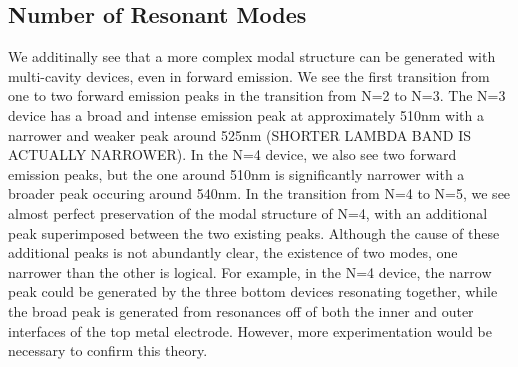 \documentclass{report}
\begin{document}
        \subsection{Number of Resonant Modes}
        We additinally see that a more complex modal structure can be generated with multi-cavity devices, even in forward emission. We see the first transition from one to two forward emission peaks in the transition from N=2 to N=3. The N=3 device has a broad and intense emission peak at approximately 510nm with a narrower and weaker peak around 525nm (SHORTER LAMBDA BAND IS ACTUALLY NARROWER). In the N=4 device, we also see two forward emission peaks, but the one around 510nm is significantly narrower with a broader peak occuring around 540nm. In the transition from N=4 to N=5, we see almost perfect preservation of the modal structure of N=4, with an additional peak superimposed between the two existing peaks. Although the cause of these additional peaks is not abundantly clear, the existence of two modes, one narrower than the other is logical. For example, in the N=4 device, the narrow peak could be generated by the three bottom devices resonating together, while the broad peak is generated from resonances off of both the inner and outer interfaces of the top metal electrode. However, more experimentation would be necessary to confirm this theory.
\end{document}
